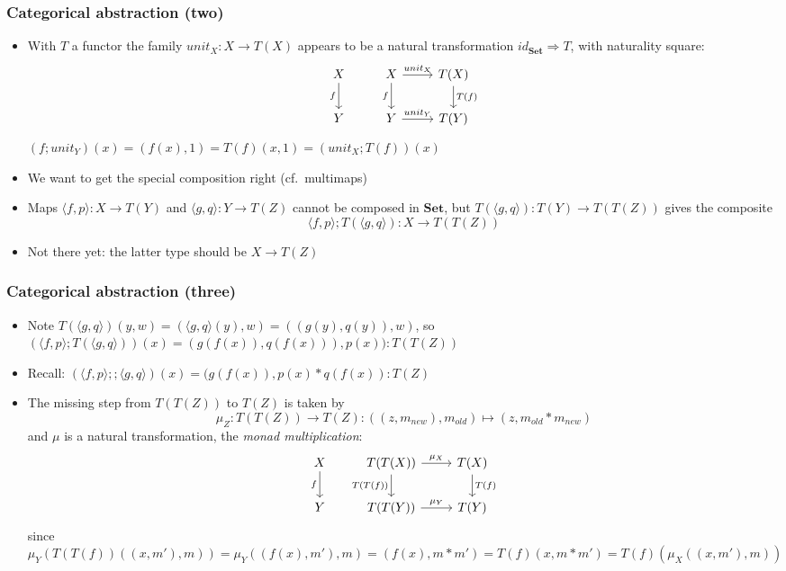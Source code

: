 \documentclass[handout]{beamer}
\newcommand{\To}{\Rightarrow}
\newcommand{\bfsf}[1]{{\boldsymbol{#1}}}
\newcommand{\Set}{\bfsf{Set}}
\newcommand{\Kp}[1]{{\langle #1 \rangle}}
\newcommand{\Kc}{;\!;}
\begin{document}
\frame
  {   
    \frametitle{Categorical abstraction (two)}\label{Mon5:CatAbstrTwo}

 \begin{itemize}[<+->]
\item With $T$ a functor the family $unit_X: X\to T(X)$ appears to be
a natural transformation $id_\Set \To T$, with naturality square:
\[
\begin{tikzcd}[ampersand replacement=\&]
X \arrow[swap]{d}{f} \& X  \arrow[swap]{d}{f}\arrow{r}{unit_X} \&\arrow{d}{T(f)} T(X)\\
Y \& Y  \arrow{r}{unit_Y} \& T(Y)
\end{tikzcd}
\]
$(f;unit_Y)(x)=(f(x),1) = T(f)(x,1) = (unit_X;T(f))(x)$
\item We want to get the special composition right (cf.\ multimaps)
\item Maps $\Kp{f,p}: X\to T(Y)$ and $\Kp{g,q}: Y\to T(Z)$ cannot be composed
in $\Set$, but $T(\Kp{g,q}) : T(Y) \to T(T(Z))$ gives the composite
$$\Kp{f,p};T(\Kp{g,q}) : X \to T(T(Z))$$
\item Not there yet: the latter type should be $X \to T(Z)$
 \end{itemize}

 }

\frame
  {   
    \frametitle{Categorical abstraction (three)}\label{Mon5:CatAbstrThree}

 \begin{itemize}[<+->]
\item Note $T(\Kp{g,q})(y,w) =  (\Kp{g,q}(y),w) = ((g(y),q(y)),w)$, so
$(\Kp{f,p};T(\Kp{g,q}))(x) = (g(f(x)),q(f(x))),p(x)): T(T(Z))$
\item Recall: $(\Kp{f,p}\Kc \Kp{g,q})(x) = (g(f(x)),p(x)*q(f(x)) : T(Z)$
\item The missing step from $T(T(Z))$ to $T(Z)$ is taken by
$$\mu_Z: T(T(Z))\to T(Z): ((z,m_{new}),m_{old}) \mapsto (z,m_{old}*m_{new})$$
and $\mu$ is a natural transformation, the \emph{monad multiplication}:
\[
\begin{tikzcd}[ampersand replacement=\&]
X \arrow[swap]{d}{f} \& T(T(X))  \arrow[swap]{d}{T(T(f))}\arrow{r}{\mu_X} \&\arrow{d}{T(f)} T(X)\\
Y \& T(T(Y))  \arrow{r}{\mu_Y} \& T(Y)
\end{tikzcd}
\]
since $\mu_Y(T(T(f))((x,m'),m)) = \mu_Y((f(x),m'),m) = (f(x), m*m') 
= T(f)(x,m*m') = T(f)(\mu_X((x,m'),m))$
 \end{itemize}

 }
\end{document}
